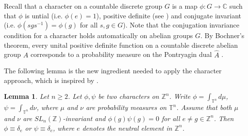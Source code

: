 \documentclass[12pt]{amsart}
\newtheorem{lem}[theorem]{Lemma}
\theoremstyle{definition}
\theoremstyle{remark}
\begin{document}
Recall that a character on a countable discrete group $G$ is a map $\phi: G\rightarrow \mathbb{C}$ such that $\phi$ is untial (i.e. $\phi(e)=1$), positive definite (see \cite[Definition 1.B.1]{bd}) and conjugate invariant (i.e. $\phi(sgs^{-1})=\phi(g)$ for all $s,g\in G$). Note that the conjugation  invariance condition for a character holds automatically on abelian groups $G$.
By Bochner's theorem, every unital positive definite function on a countable discrete abelian group $A$ corresponds to a probability measure on the Pontryagin dual $\widehat{A}$ \cite[Theorem D.2.2]{bdv}. 

The following lemma is the new ingredient needed to apply the character approach, which is inspired by \cite[Proposition 3.13]{dj}.

\begin{lem}\label{3.2}
Let $n\geq 2$. Let $\phi, \psi$ be two characters on $\mathbb{Z}^n$. Write $\phi = \int_{\mathbb{T}^n} d\mu$, $\psi = \int_{\mathbb{T}^{n}} d\nu$, where $\mu$ and $\nu$ are probability measures on $\mathbb{T}^n$. Assume that both $\mu$ and $\nu$ are $SL_{n}(\mathbb{Z})$-invariant and $\phi(g)\psi(g) = 0$ for all $e\ne g\in\mathbb{Z}^n$. Then $\phi \equiv \delta_{e}$ or $\psi \equiv \delta_{e}$, where $e$ denotes the neutral element in $\mathbb{Z}^n$. 
\end{lem}
\end{document}
